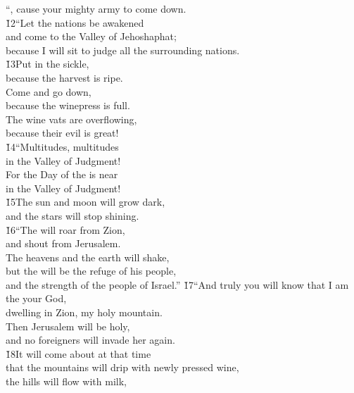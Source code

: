 \begin{poetry}
\poemlll       ``, cause your mighty army to come down. \\
\poeml \v{12}``Let the nations be awakened \\
\poemll    and come to the Valley of Jehoshaphat; \\
\poemlll       because I will sit to judge all the surrounding nations. \\
\poeml \v{13}Put in the sickle, \\
\poemll    because the harvest is ripe. \\
\poeml Come and go down, \\
\poemll    because the winepress is full. \\
\poeml The wine vats are overflowing, \\
\poemll    because their evil is great! \\
\poeml \v{14}``Multitudes, multitudes \\
\poemll    in the Valley of Judgment! \\
\poeml For the Day of the  is near \\
\poemll    in the Valley of Judgment! \\
\poeml \v{15}The sun and moon will grow dark, \\
\poemll    and the stars will stop shining. \\
\poeml \v{16}``The  will roar from Zion, \\
\poemll    and shout from Jerusalem. \\
\poeml The heavens and the earth will shake, \\
\poemll    but the  will be the refuge of his people, \\
\poemlll       and the strength of the people of Israel.''
\poeml \v{17}``And truly you will know that I am the  your God, \\
\poemll    dwelling in Zion, my holy mountain. \\
\poeml Then Jerusalem will be holy, \\
\poemll    and no foreigners will invade her again. \\
\poeml \v{18}It will come about at that time \\
\poemll    that the mountains will drip with newly pressed wine, \\
\poeml the hills will flow with milk, \\

\end{poetry}
